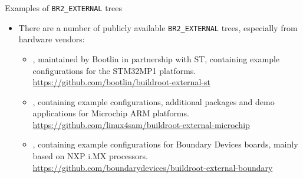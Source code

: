 \begin{frame}{Examples of {\tt BR2\_EXTERNAL} trees}
  \begin{itemize}
  \item There are a number of publicly available {\tt BR2\_EXTERNAL}
    trees, especially from hardware vendors:
    \begin{itemize}
    \item {}, maintained by Bootlin in
      partnership with ST, containing example configurations for the
      STM32MP1 platforms.\\
      \url{https://github.com/bootlin/buildroot-external-st}
    \item {}, containing example
      configurations, additional packages and demo applications for
      Microchip ARM platforms.\\
      \url{https://github.com/linux4sam/buildroot-external-microchip}
    \item {}, containing example
      configurations for Boundary Devices boards, mainly based on NXP
      i.MX processors.\\
      \url{https://github.com/boundarydevices/buildroot-external-boundary}
    \end{itemize}
  \end{itemize}
\end{frame}

